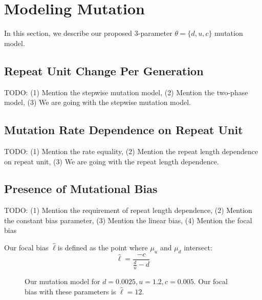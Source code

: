 \section{Modeling Mutation}\label{sec:mm}
In this section, we describe our proposed 3-parameter $\theta = \{ d, u, c\}$ mutation model.

\subsection{Repeat Unit Change Per Generation}\label{subsec:rucpg}
TODO: (1) Mention the stepwise mutation model, (2) Mention the two-phase model,
(3) We are going with the stepwise mutation model.

\subsection{Mutation Rate Dependence on Repeat Unit}\label{subsec:mrdonru}
TODO: (1) Mention the rate equality, (2) Mention the repeat length dependence on repeat unit,
(3) We are going with the repeat length dependence.

\subsection{Presence of Mutational Bias}\label{subsec:pomb}
TODO: (1) Mention the requirement of repeat length dependence, (2) Mention the constant bias parameter,
(3) Mention the linear bias, (4) Mention the focal bias

Our focal bias $\hat{\ell} $is defined as the point where $\mu_u$ and $\mu_d$ intersect:
\begin{equation}
    \hat{\ell} = \frac{-c}{\frac{d}{u} - d}
\end{equation}

\begin{figure}
    \centering{}
    \caption{Our mutation model for $d=0.0025, u=1.2, c=0.005$.
    Our focal bias with these parameters is $\hat{\ell}=12$.}\label{fig:mutationModel}
\end{figure}